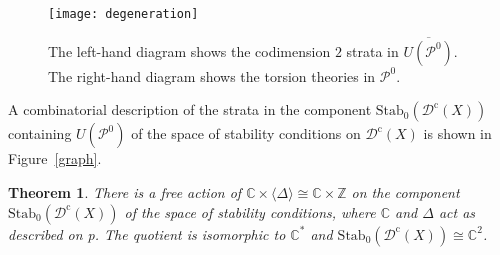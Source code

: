 \documentclass{article}
\theoremstyle{plain}
\newtheorem{theorem}{Theorem}[section] %
\theoremstyle{definition}
\theoremstyle{remark}
\newcommand{\Z}{\mathbb{Z}}
\newcommand{\C}{\mathbb{C}}
\newcommand{\cat}[1]{\mathcal{#1}}
\newcommand{\constr}[1]{\cat{D}^\textrm{c}(#1)}
\newcommand{\stabo}[1]{\mathrm{Stab}_0(#1)}
\begin{document}
\begin{figure}[htbp]
\begin{center}
\texttt{[image: degeneration]}
\caption{The left-hand diagram shows the codimension $2$ strata in $\overline{U(\cat{P}^0)}$. The right-hand diagram shows the torsion theories in $\cat{P}^0$.  }
\label{bdy picture}
\end{center}
\end{figure}




A combinatorial description of the strata in the component $\stabo{\constr{X}}$ containing $U(\cat{P}^0)$ of the space of stability conditions on $\constr{X}$ is shown in Figure~\ref{graph}. 
\begin{theorem}
\label{c2thm}
There is a free action of $\C\times \langle \Delta\rangle \cong \C\times \Z$ on the component $\stabo{\constr{X}}$ of the space of stability conditions, where $\C$ and $\Delta$ act as described on p\pageref{c action}. The quotient is isomorphic to $\C^*$ and $\stabo{\constr{X}} \cong \C^2$.
\end{theorem}
\end{document}
